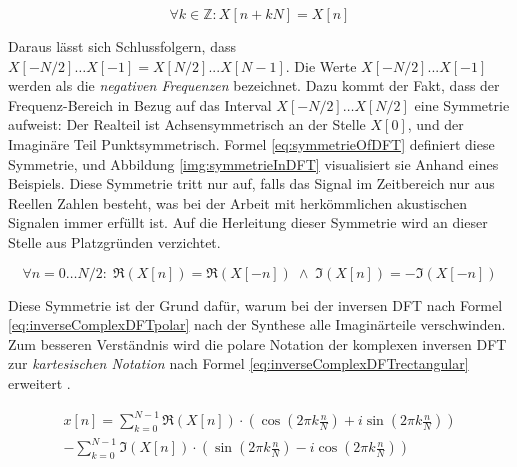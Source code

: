 \begin{equation}
\label{eq:periodicityOfDFT}
\forall k \in \mathbb{Z}: X[n+kN] = X[n]
\end{equation}

Daraus lässt sich Schlussfolgern, dass $X[-N/2] \ldots X[-1] = X[N/2] ... X[N-1]$. Die Werte $X[-N/2] ... X[-1]$ werden als die \emph{negativen Frequenzen} bezeichnet. Dazu kommt der Fakt, dass der Frequenz-Bereich in Bezug auf das Interval $X[-N/2] \ldots X[N/2]$ eine Symmetrie aufweist: Der Realteil ist Achsensymmetrisch an der Stelle $X[0]$, und der Imaginäre Teil Punktsymmetrisch. Formel \ref{eq:symmetrieOfDFT} definiert diese Symmetrie, und Abbildung \ref{img:symmetrieInDFT} visualisiert sie Anhand eines Beispiels.  Diese Symmetrie tritt nur auf, falls das Signal im Zeitbereich nur aus Reellen Zahlen besteht, was bei der Arbeit mit  herkömmlichen akustischen Signalen immer erfüllt ist. Auf die Herleitung dieser Symmetrie wird an dieser Stelle aus Platzgründen verzichtet. \cite[S. 574]{dspGuide}


\begin{equation}
\label{eq:symmetrieOfDFT}
\forall n = 0 \ldots N/2 : \; \Re (X[n]) = \Re(X[-n]) \; \wedge \; \Im (X[n]) = -\Im(X[-n]) 
\end{equation}

Diese Symmetrie ist der Grund dafür, warum bei der inversen DFT nach Formel \ref{eq:inverseComplexDFTpolar} nach der Synthese alle Imaginärteile verschwinden. Zum besseren Verständnis wird die polare Notation der komplexen inversen DFT zur \emph{kartesischen Notation} nach Formel \ref{eq:inverseComplexDFTrectangular} erweitert .\cite[S. 573]{dspGuide}

\begin{equation}
\begin{split}
x[n] =  \sum_{k = 0}^{N-1}  
\Re(X[n]) \cdot (\cos (2\pi k \frac{n}{N}) + i \sin (2 \pi k \frac{n}{N}) ) \\ 
- \sum_{k = 0}^{N-1}
\Im(X[n]) \cdot (\sin (2\pi k \frac{n}{N}) - i \cos(2 \pi k \frac{n}{N}) )
\end{split}
\label{eq:inverseComplexDFTrectangular}
\end{equation}

